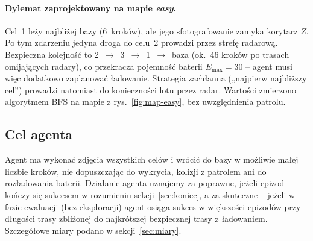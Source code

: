 \paragraph{Dylemat zaprojektowany na mapie \emph{easy}.} Cel~1 leży najbliżej
bazy (6~kroków), ale jego sfotografowanie zamyka korytarz $Z$. Po tym
zdarzeniu jedyna droga do celu~2 prowadzi przez strefę radarową. Bezpieczna
kolejność to 2~$\rightarrow$~3~$\rightarrow$~1~$\rightarrow$~baza
(ok.\ 46 kroków po trasach omijających radary), co przekracza pojemność
baterii $E_{\max}=30$ -- agent musi więc dodatkowo zaplanować ładowanie.
Strategia zachłanna („najpierw najbliższy cel'') prowadzi natomiast do
konieczności lotu przez radar. Wartości zmierzono algorytmem BFS na mapie
z rys.~\ref{fig:map-easy}, bez uwzględnienia patrolu.

\subsection{Cel agenta}
\label{sec:cel}

Agent ma wykonać zdjęcia wszystkich celów i wrócić do bazy w możliwie małej
liczbie kroków, nie dopuszczając do wykrycia, kolizji z patrolem ani do
rozładowania baterii. Działanie agenta uznajemy za poprawne, jeżeli epizod
kończy się sukcesem w rozumieniu sekcji~\ref{sec:koniec}, a za skuteczne --
jeżeli w fazie ewaluacji (bez eksploracji) agent osiąga sukces w większości
epizodów przy długości trasy zbliżonej do najkrótszej bezpiecznej trasy
z ładowaniem. Szczegółowe miary podano w sekcji~\ref{sec:miary}.
